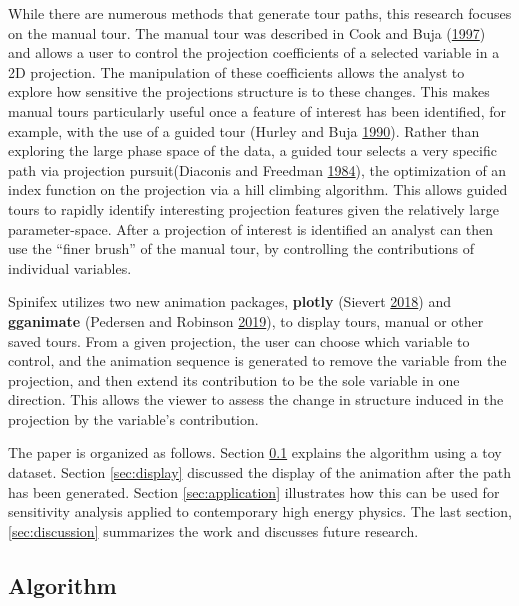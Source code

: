 While there are numerous methods that generate tour paths, this research
focuses on the manual tour. The manual tour was described in Cook and
Buja (\protect\hyperlink{ref-cook_manual_1997}{1997}) and allows a user
to control the projection coefficients of a selected variable in a 2D
projection. The manipulation of these coefficients allows the analyst to
explore how sensitive the projections structure is to these changes.
This makes manual tours particularly useful once a feature of interest
has been identified, for example, with the use of a guided tour (Hurley
and Buja \protect\hyperlink{ref-hurley_analyzing_1990}{1990}). Rather
than exploring the large phase space of the data, a guided tour selects
a very specific path via projection pursuit(Diaconis and Freedman
\protect\hyperlink{ref-diaconis_asymptotics_1984}{1984}), the
optimization of an index function on the projection via a hill climbing
algorithm. This allows guided tours to rapidly identify interesting
projection features given the relatively large parameter-space. After a
projection of interest is identified an analyst can then use the ``finer
brush'' of the manual tour, by controlling the contributions of
individual variables.

Spinifex utilizes two new animation packages, \textbf{plotly} (Sievert
\protect\hyperlink{ref-sievert_plotly_2018}{2018}) and
\textbf{gganimate} (Pedersen and Robinson
\protect\hyperlink{ref-pedersen_gganimate:_2019}{2019}), to display
tours, manual or other saved tours. From a given projection, the user
can choose which variable to control, and the animation sequence is
generated to remove the variable from the projection, and then extend
its contribution to be the sole variable in one direction. This allows
the viewer to assess the change in structure induced in the projection
by the variable's contribution.

The paper is organized as follows. Section \ref{sec:algorithm} explains
the algorithm using a toy dataset. Section \ref{sec:display} discussed
the display of the animation after the path has been generated. Section
\ref{sec:application} illustrates how this can be used for sensitivity
analysis applied to contemporary high energy physics. The last section,
\ref{sec:discussion} summarizes the work and discusses future research.

\hypertarget{sec:algorithm}{%
\subsection{Algorithm}\label{sec:algorithm}}

